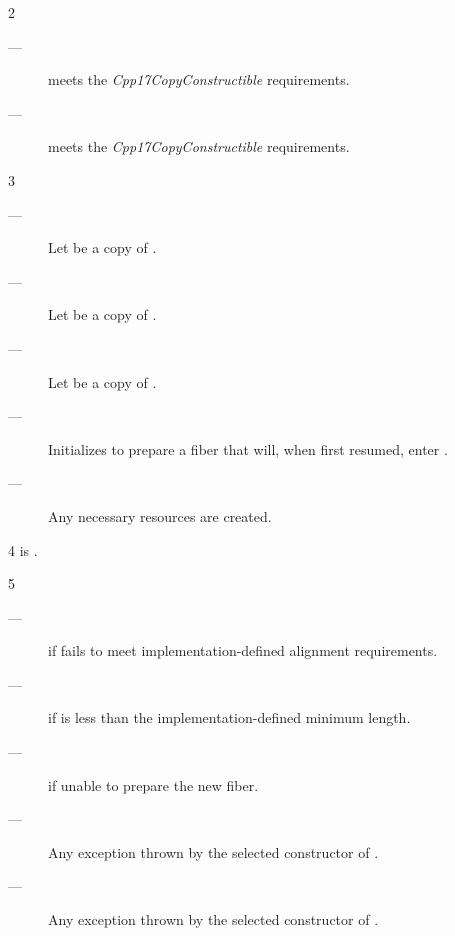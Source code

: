 2 \constraints
\begin{description}
    \item[---]  meets the \emph{Cpp17CopyConstructible} requirements.
    \item[---]  meets the \emph{Cpp17CopyConstructible} requirements.
\end{description}

3 \effects
\begin{description}
    \item[---] Let  be a copy of .
    \item[---] Let  be a copy of .
    \item[---] Let  be a copy of .
    \item[---] Initializes  to prepare a fiber that will, when
               first resumed, enter .
    \item[---] Any necessary resources are created.
\end{description}

4 \postcond
\emptyfn is \false.

5 \except
\begin{description}
    \item[---]  if  fails to meet
               implementation-defined alignment requirements.
    \item[---]  if  is less than the
               implementation-defined minimum length.
    \item[---]  if unable to prepare the new fiber.
    \item[---] Any exception thrown by the selected constructor of .
    \item[---] Any exception thrown by the selected constructor of .
\end{description}

